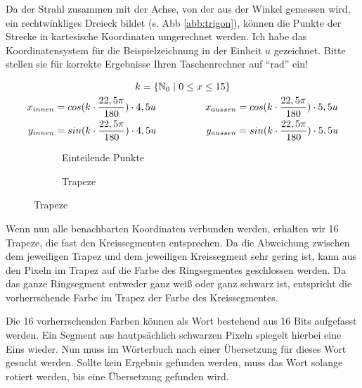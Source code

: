Da der Strahl zusammen mit der Achse, von der aus der Winkel gemessen wird, ein rechtwinkliges Dreieck bildet (s. Abb \ref{abb:trigon}), können die Punkte der Strecke in kartesische Koordinaten umgerechnet werden. Ich habe das Koordinatensystem für die Beispielzeichnung in der Einheit \(u\) gezeichnet. Bitte stellen sie für korrekte Ergebnisse Ihren Taschenrechner auf "`rad"' ein!

\begin{gather}
k = \{\mathbb{N}_0 \hspace{0.3em}|\hspace{0.3em} 0 \le x \le 15\} \\
\begin{split}
x_{innen} &= cos(k \cdot \frac{22,5\pi}{180}) \cdot 4,5u \\
y_{innen} &= sin(k \cdot \frac{22,5\pi}{180}) \cdot 4,5u
\end{split}
\hspace{5em}
\begin{split}
x_{aussen} &= cos(k \cdot \frac{22,5\pi}{180}) \cdot 5,5u \\
y_{aussen} &= sin(k \cdot \frac{22,5\pi}{180}) \cdot 5,5u
\end{split}
\end{gather}

\begin{figure}[!ht]
	\begin{subfigure}[b]{0.5\textwidth}
		\centering	
		
		\caption{Einteilende Punkte}
	\end{subfigure}
	\begin{subfigure}[b]{0.5\textwidth}
		\centering	
		
		\caption{Trapeze}
	\end{subfigure}
\end{figure}

Wenn nun alle benachbarten Koordinaten verbunden werden, erhalten wir 16 Trapeze, die fast den Kreissegmenten entsprechen. Da die Abweichung zwischen dem jeweiligen Trapez und dem jeweiligen Kreissegment sehr gering ist, kann aus den Pixeln im Trapez auf die Farbe des Ringsegmentes geschlossen werden. Da das ganze Ringsegment entweder ganz weiß oder ganz schwarz ist, entspricht die vorherrschende Farbe im Trapez der Farbe des Kreissegmentes.

Die 16 vorherrschenden Farben können als Wort bestehend aus 16 Bits aufgefasst werden. Ein Segment aus hautpsächlich schwarzen Pixeln spiegelt hierbei eine Eins wieder. Nun muss im Wörterbuch nach einer Übersetzung für dieses Wort gesucht werden. Sollte kein Ergebnis gefunden werden, muss das Wort solange rotiert werden, bis eine Übersetzung gefunden wird.

